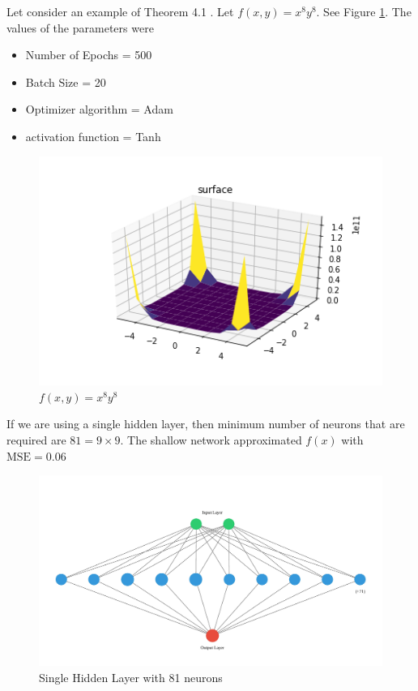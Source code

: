 \documentclass{article}
\begin{document}
Let consider an example of Theorem 4.1 . Let $f(x,y) = x^8 y^8$. See Figure \ref{fig:figure20}. The values of the parameters were 
\begin{itemize}
    \item Number of Epochs = 500
    \item Batch Size = 20
    \item Optimizer algorithm = Adam
    \item activation function = Tanh
\end{itemize}
\begin{figure}[h!]
    \centering
    \includegraphics[width=0.7 \textwidth]{Images/1/Original.png}
    \caption{$f(x,y) = x^8 y^8$}
    \label{fig:figure20}
\end{figure}
\newpage
If we are using a single hidden layer, then minimum number of neurons that are required are $ 81 = 9 \times 9 $. The shallow network approximated $f(x)$ with $ \mbox{MSE} = 0.06$
\begin{figure}[h!]
    \centering
    \includegraphics[width=0.8 \textwidth]{Images/1/ShallowNetwork81.jpg}
    \caption{Single Hidden Layer with 81 neurons}
    \label{fig:figure21}
\end{figure}
\end{document}

